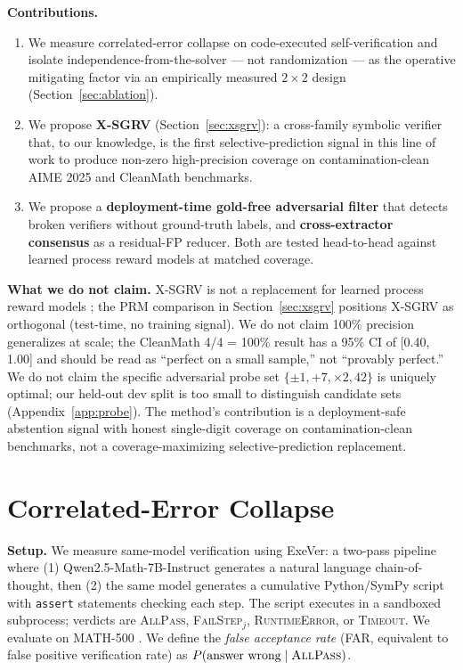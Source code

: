 \documentclass{article}
\begin{document}
\textbf{Contributions.}
\begin{enumerate}[leftmargin=*,itemsep=1pt]
\item We measure correlated-error collapse on code-executed self-verification and isolate independence-from-the-solver --- not randomization --- as the operative mitigating factor via an empirically measured $2 \times 2$ design (Section~\ref{sec:ablation}).
\item We propose \textbf{X-SGRV} (Section~\ref{sec:xsgrv}): a cross-family symbolic verifier that, to our knowledge, is the first selective-prediction signal in this line of work to produce non-zero high-precision coverage on contamination-clean AIME 2025 and CleanMath benchmarks.
\item We propose a \textbf{deployment-time gold-free adversarial filter} that detects broken verifiers without ground-truth labels, and \textbf{cross-extractor consensus} as a residual-FP reducer. Both are tested head-to-head against learned process reward models at matched coverage.
\end{enumerate}

\textbf{What we do not claim.} X-SGRV is not a replacement for learned process reward models \citep{lightman2024prm, mathshepherd2024, genprm2025, qwenprm2025}; the PRM comparison in Section~\ref{sec:xsgrv} positions X-SGRV as orthogonal (test-time, no training signal). We do not claim 100\% precision generalizes at scale; the CleanMath 4/4 = 100\% result has a 95\% CI of [0.40, 1.00] and should be read as ``perfect on a small sample,'' not ``provably perfect.'' We do not claim the specific adversarial probe set $\{\pm 1, +7, \times 2, 42\}$ is uniquely optimal; our held-out dev split is too small to distinguish candidate sets (Appendix~\ref{app:probe}). The method's contribution is a deployment-safe abstention signal with honest single-digit coverage on contamination-clean benchmarks, not a coverage-maximizing selective-prediction replacement.

\section{Correlated-Error Collapse}
\label{sec:collapse}

\textbf{Setup.} We measure same-model verification using ExeVer: a two-pass pipeline where (1) Qwen2.5-Math-7B-Instruct \citep{yang2024qwen25math} generates a natural language chain-of-thought, then (2) the same model generates a cumulative Python/SymPy \citep{meurer2017sympy} script with \texttt{assert} statements checking each step. The script executes in a sandboxed subprocess; verdicts are \textsc{AllPass}, \textsc{FailStep$_j$}, \textsc{RuntimeError}, or \textsc{Timeout}. We evaluate on MATH-500 \citep{hendrycks2021math, lightman2024prm}. We define the \emph{false acceptance rate} (FAR, equivalent to false positive verification rate) as $P(\text{answer wrong} \mid \textsc{AllPass})$.
\end{document}
